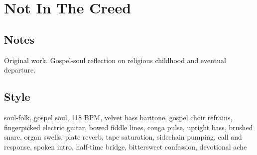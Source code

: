 \section{Not In The Creed}

\subsection{Notes}
Original work.
Gospel-soul reflection on religious childhood and eventual departure.

\subsection{Style}
soul-folk, gospel soul, 118 BPM, velvet bass baritone, gospel choir refrains, fingerpicked electric guitar, bowed fiddle lines, conga pulse, upright bass, brushed snare, organ swells, plate reverb, tape saturation, sidechain pumping, call and response, spoken intro, half-time bridge, bittersweet confession, devotional ache

